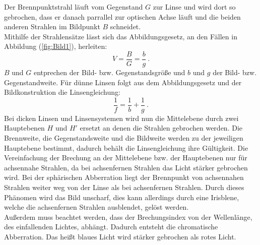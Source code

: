 Der Brennpunktstrahl läuft vom Gegenstand $G$ zur Linse und wird dort so gebrochen, dass er danach parrallel zur optischen Achse läuft und die beiden anderen Strahlen im Bildpunkt $B$ schneidet.\\
Mithilfe der Strahlensätze lässt sich das Abbildungsgesetz, an den Fällen in Abbildung (\ref{fig:Bild1}), herleiten:
\begin{equation}
	V = \frac{B}{G} = \frac{b}{g} \ .
	\label{eqn:V}
\end{equation}
$B$ und $G$ entprechen der Bild- bzw. Gegenstandsgröße und $b$ und $g$ der Bild- bzw. Gegenstandweite. Für dünne Linsen folgt aus dem Abbildungsgesetz und der Bildkonstruktion die Linsengleichung:
\begin{equation}
	\frac{1}{f} = \frac{1}{b} + \frac{1}{g} \ .
	\label{eqn:D}
\end{equation}
Bei dicken Linsen und Linsensystemen wird nun die Mittelebene durch zwei Hauptebenen $H$ und $H'$ ersetzt an denen die Strahlen gebrochen werden. Die Brennweite, die Gegenstandsweite und die Bildweite werden zu der jeweiligen Hauptebene bestimmt, dadurch behält die Linsengleichung ihre Gültigkeit. Die Vereinfachung der Brechung an der Mittelebene bzw. der Hauptebenen nur für achsennahe Strahlen, da bei achsenfernen Strahlen das Licht stärker gebrochen wird. Bei der sphärischen Abberration liegt der Brennpunkt von achsennahen Strahlen weiter weg von der Linse als bei achsenfernen Strahlen. Durch dieses Phänomen wird das Bild unscharf, dies kann allerdings durch eine Irisblene, welche die achsenfernen Strahlen ausblendet, gelöst werden. \\
Außerdem muss beachtet werden, dass der Brechungsindex von der Wellenlänge, des einfallenden Lichtes, abhängt. Dadurch entsteht die chromatische Abberration. Das heißt blaues Licht wird stärker gebrochen als rotes Licht.

